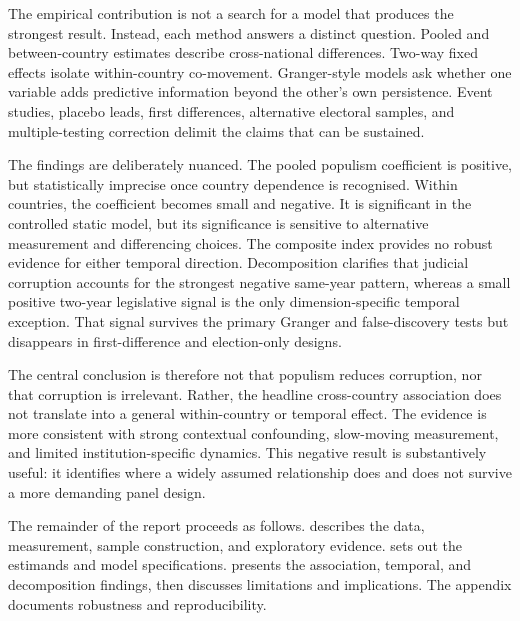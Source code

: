 The empirical contribution is not a search for a model that produces the strongest result. Instead,
each method answers a distinct question. Pooled and between-country estimates describe cross-national
differences. Two-way fixed effects isolate within-country co-movement. Granger-style models ask whether
one variable adds predictive information beyond the other's own persistence. Event studies, placebo
leads, first differences, alternative electoral samples, and multiple-testing correction delimit the
claims that can be sustained.

The findings are deliberately nuanced. The pooled populism coefficient is positive, but statistically
imprecise once country dependence is recognised. Within countries, the coefficient becomes small and
negative. It is significant in the controlled static model, but its significance is sensitive to
alternative measurement and differencing choices. The composite index provides no robust evidence for
either temporal direction. Decomposition clarifies that judicial corruption accounts for the strongest
negative same-year pattern, whereas a small positive two-year legislative signal is the only
dimension-specific temporal exception. That signal survives the primary Granger and false-discovery
tests but disappears in first-difference and election-only designs.

The central conclusion is therefore not that populism reduces corruption, nor that corruption is
irrelevant. Rather, the headline cross-country association does not translate into a general
within-country or temporal effect. The evidence is more consistent with strong contextual confounding,
slow-moving measurement, and limited institution-specific dynamics. This negative result is
substantively useful: it identifies where a widely assumed relationship does and does not survive a
more demanding panel design.

The remainder of the report proceeds as follows.  describes the data, measurement,
sample construction, and exploratory evidence.  sets out the estimands and model
specifications.  presents the association, temporal, and decomposition findings,
then discusses limitations and implications. The appendix documents robustness and reproducibility.
